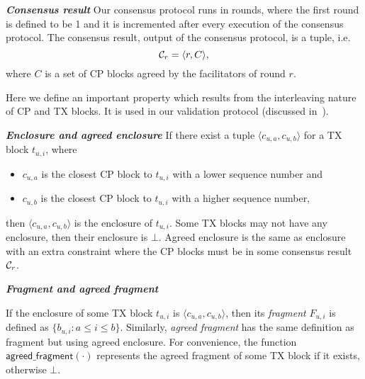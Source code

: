 \begin{definition}
\label{sec:consensus-result}
\textbf{\emph{Consensus result}}
Our consensus protocol runs in rounds,
where the first round is defined to be 1 and it is incremented after every execution of the consensus protocol.
The consensus result, output of the consensus protocol, is a tuple, i.e. 
$$\mathcal{C}_r = \langle r, C \rangle,$$
where $C$ is a set of CP blocks agreed by the facilitators of round $r$.
\end{definition}

Here we define an important property which results from the interleaving nature of CP and TX blocks.
It is used in our validation protocol (discussed in~).

\begin{definition}
\textbf{\emph{Enclosure and agreed enclosure}}
If there exist a tuple $\langle c_{u,a}, c_{u, b} \rangle$ for a TX block $t_{u, i}$, where
\begin{itemize}
\item $c_{u, a}$ is the closest CP block to $t_{u, i}$ with a lower sequence number and
\item $c_{u, b}$ is the closest CP block to $t_{u, i}$ with a higher sequence number,
\end{itemize}
then $\langle c_{u,a}, c_{u, b} \rangle$ is the enclosure of $t_{u, i}$.
Some TX blocks may not have any enclosure, then their enclosure is $\bot$.
Agreed enclosure is the same as enclosure with an extra constraint where the CP blocks must be in some consensus result $\mathcal{C}_r$.
\end{definition}

\begin{definition}
\textbf{\emph{Fragment and agreed fragment}}

If the enclosure of some TX block $t_{u, i}$ is $\langle c_{u,a}, c_{u, b} \rangle$,
then its \emph{fragment} $F_{u, i}$ is defined as $\{ b_{u, i} : a \le i \le b \}$.
Similarly, \emph{agreed fragment} has the same definition as fragment but using agreed enclosure.
For convenience, the function $\textsf{agreed\_fragment}(\cdot)$ represents the agreed fragment of some TX block if it exists, otherwise $\bot$.
\end{definition}

